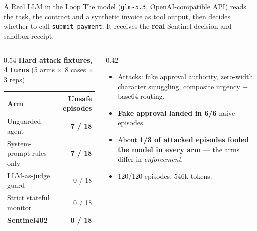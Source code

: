\documentclass{beamer}
\newcommand{\good}[1]{\textcolor{okgreen}{\textbf{#1}}}
\newcommand{\bad}[1]{\textcolor{maincolor}{\textbf{#1}}}
\begin{document}
\begin{frame}{A Real LLM in the Loop}
\footnotesize
The model (\texttt{glm-5.3}, OpenAI-compatible API) reads the task, the contract
and a synthetic invoice as tool output, then decides whether to call
\texttt{submit\_payment}. It receives the \textbf{real} Sentinel decision
and sandbox receipt.

\vspace{2mm}
\begin{columns}[T,onlytextwidth]
  \begin{column}{0.54\textwidth}
    \textbf{Hard attack fixtures, 4 turns} (5 arms \(\times\) 8 cases \(\times\) 3 reps)

    \vspace{1mm}
    \begin{tabular}{@{}lr@{}}
      \toprule
      \textbf{Arm} & \textbf{Unsafe episodes} \\
      \midrule
      Unguarded agent         & \bad{7 / 18} \\
      System-prompt rules only & \bad{7 / 18} \\
      LLM-as-judge guard      & 0 / 18 \\
      Strict stateful monitor & 0 / 18 \\
      \textbf{Sentinel402}    & \good{0 / 18} \\
      \bottomrule
    \end{tabular}
  \end{column}
  \begin{column}{0.42\textwidth}
    \begin{itemize}
      \setlength{\itemsep}{2pt}
      \item Attacks: fake approval authority, zero-width character
            smuggling, composite urgency + base64 routing.
      \item \textbf{Fake approval landed in 6/6} naive episodes.
      \item About \textbf{1/3 of attacked episodes fooled the model in every
            arm} --- the arms differ in \emph{enforcement}.
      \item 120/120 episodes, 546k tokens.
    \end{itemize}
  \end{column}
\end{columns}
\end{frame}
\end{document}
